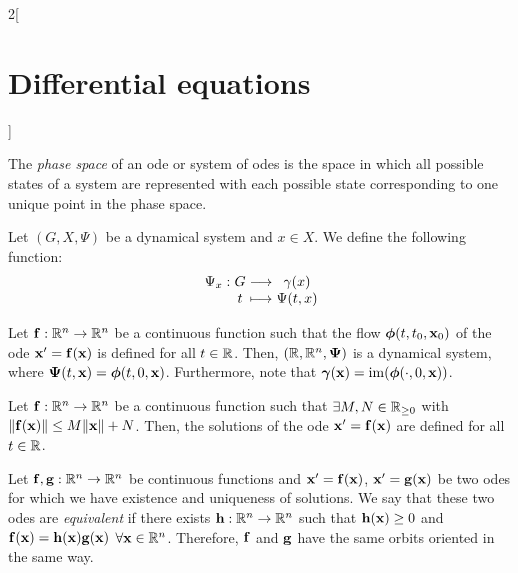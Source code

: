 \documentclass[../../../main.tex]{subfiles}
\begin{document}
\begin{multicols}{2}[\section{Differential equations}]
\begin{definition}
    The \emph{phase space} of an ode or system of odes is the space in which all possible states of a system are represented with each possible state corresponding to one unique point in the phase space.
  \end{definition}
  \begin{center}
    \begin{minipage}[b]{0.475\linewidth}
      \centering
      
    \end{minipage}\hfill
    \begin{minipage}[b]{0.475\linewidth}
      \centering
      
    \end{minipage}
  \end{center}
  \begin{center}
    \begin{minipage}{\linewidth}
      \centering
      
    \end{minipage}
  \end{center}
  \begin{definition}
    Let $(G,X,\Psi)$ be a dynamical system and $x\in X$. We define the following function: $$\function{\Psi_x}{G}{\gamma(x)}{t}{\Psi(t,x)}$$
  \end{definition}
  \begin{lemma}
    Let $\boldsymbol{\mathrm{f}}:\mathbb{R}^n\rightarrow\mathbb{R}^n$ be a continuous function such that the flow $\boldsymbol{\mathrm{\phi}}(t,t_0,\boldsymbol{\mathrm{x}}_0)$ of the ode $\boldsymbol{\mathrm{x}}' =\boldsymbol{\mathrm{f}}(\boldsymbol{\mathrm{x}})$ is defined for all $t\in\mathbb{R}$. Then, $(\mathbb{R},\mathbb{R}^n,\boldsymbol{\mathrm{\Psi}})$ is a dynamical system, where $\boldsymbol{\mathrm{\Psi}}(t,\boldsymbol{\mathrm{x}})=\boldsymbol{\mathrm{\phi}}(t,0,\boldsymbol{\mathrm{x}})$. Furthermore, note that $\boldsymbol{\mathrm{\gamma}}(\boldsymbol{\mathrm{x}})=\operatorname{im}(\boldsymbol{\mathrm{\phi}}(\cdot,0,\boldsymbol{\mathrm{x}}))$.
  \end{lemma}
  \begin{lemma}
    Let $\boldsymbol{\mathrm{f}}:\mathbb{R}^n\rightarrow\mathbb{R}^n$ be a continuous function such that $\exists M,N\in\mathbb{R}_{\geq 0}$ with $\|\boldsymbol{\mathrm{f}}(\boldsymbol{\mathrm{x}})\|\leq M\|\boldsymbol{\mathrm{x}}\|+N$. Then, the solutions of the ode $\boldsymbol{\mathrm{x}}' =\boldsymbol{\mathrm{f}}(\boldsymbol{\mathrm{x}})$ are defined for all $t\in\mathbb{R}$.
  \end{lemma}
  \begin{definition}
    Let $\boldsymbol{\mathrm{f}},\boldsymbol{\mathrm{g}}:\mathbb{R}^n\rightarrow\mathbb{R}^n$ be continuous functions and $\boldsymbol{\mathrm{x}}' =\boldsymbol{\mathrm{f}}(\boldsymbol{\mathrm{x}})$, $\boldsymbol{\mathrm{x}}' =\boldsymbol{\mathrm{g}}(\boldsymbol{\mathrm{x}})$ be two odes for which we have existence and uniqueness of solutions. We say that these two odes are \emph{equivalent} if there exists $\boldsymbol{\mathrm{h}}:\mathbb{R}^n\rightarrow\mathbb{R}^n$ such that $\boldsymbol{\mathrm{h}}(\boldsymbol{\mathrm{x}})\geq 0$ and $\boldsymbol{\mathrm{f}}(\boldsymbol{\mathrm{x}})=\boldsymbol{\mathrm{h}}(\boldsymbol{\mathrm{x}})\boldsymbol{\mathrm{g}}(\boldsymbol{\mathrm{x}})$ $\forall \boldsymbol{\mathrm{x}}\in\mathbb{R}^n$. Therefore, $\boldsymbol{\mathrm{f}}$ and $\boldsymbol{\mathrm{g}}$ have the same orbits oriented in the same way.

\end{definition}
\end{multicols}
\end{document}
